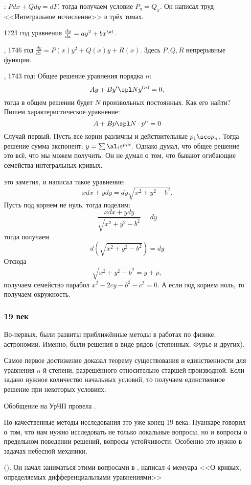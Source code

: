\documentclass[a4paper,oneside,fleqn,10pt]{article}
\begin{document}
: $Pdx + Qdy = dF$, тогда получаем условие $P_y = Q_x$. Он написал
труд <<Интегральное исчисление>> в трёх томах.

1723 год уравнения  $\frac{dy}{dx} = ay^2 + bx^\al$.

, 1746 год $\frac{dy}{dx} = P(x)y^2 + Q(x)y + R(x)$.
Здесь $P, Q, R$ непрерывные функции.

, 1743 год: Общее решение уравнения порядка $n$:
$$Ay + B y' \spl N y^{(n)} = 0,$$
тогда в общем решении будет $N$ произвольных постоянных.
Как его найти? Пишем характеристическое уравнение:
$$A + Bp \spl N \cdot p^n =0$$
Случай первый. Пусть все корни различны и действительные $p_1\sco p_n$.
Тогда решение сумма экспонент:
$y = \sum \al_i e^{p_i x}$.
Однако  думал, что общее решение это всё, что мы можем получить.
Он не думал о том, что бывают огибающие семейства интегральных кривых.

 это заметил, и написал такое уравнение:
$$x dx + y dy = dy \sqrt{x^2 + y^2 - b^2}.$$
Пусть под корнем не нуль, тогда поделим:
$$\frac{x dx + y dy}{\sqrt{x^2 + y^2 - b^2}} = dy$$
тогда получаем
$$d(\sqrt{x^2 + y^2 - b^2}) = dy$$
Отсюда
$$\sqrt{x^2 + y^2 - b^2} = y + \rho,$$
получаем семейство парабол
$x^2 - 2cy - b^2 -c^2 = 0$.
А если под корнем ноль, то получаем окружность.

\subsubsection{19 век}

Во-первых, были развиты приближённые методы в работах по физике, астрономии.
Именно, были решения в виде рядов (степенных, Фурье и других).

Самое первое достижение  доказал теорему существования и единственности
для уравнения $n$ й степени, разрешённого относительно старшей производной.
Если задано нужное количество начальных условий, то получаем единственное решение
при некоторых условиях.

Обобщение на УрЧП провела .

Но качественные методы исследования это уже конец 19 века.
Пуанкаре говорил о том, что нам нужно исследовать не только локальные вопросы,
но и вопросы о предельном поведении решений, вопросы устойчивости.
Особенно это нужно в задачах небесной механики.

 (). Он начал заниматься этими вопросами в ,
написал 4 мемуара <<О кривых, определяемых дифференциальными уравнениями>>
\end{document}
